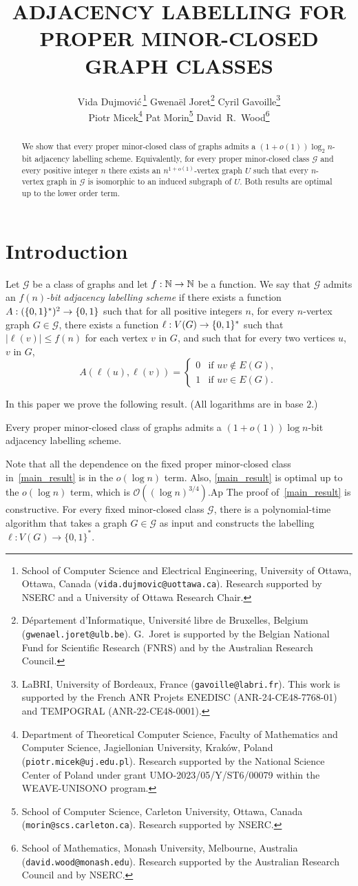 \documentclass{patmorin}
\title{\MakeUppercase{\boldmath  Adjacency labelling for proper minor-closed graph classes}}
\author{
 Vida Dujmovi{\'c}\,\footnote{School of Computer Science and Electrical Engineering, University of Ottawa, Ottawa, Canada (\texttt{vida.dujmovic@uottawa.ca}). Research supported by NSERC and a University of Ottawa Research Chair.}
 \qquad
 Gwena\"el Joret\footnote{D\'epartement d'Informatique, Universit\'e libre de Bruxelles, Belgium ({\tt gwenael.joret@ulb.be}). G.\ Joret is supported by the Belgian National Fund for Scientific Research (FNRS) and by the Australian Research Council.}
 \qquad
 Cyril Gavoille\footnote{LaBRI, University of Bordeaux, France (\texttt{gavoille@labri.fr}). This work is supported by the French ANR Projets ENEDISC (ANR-24-CE48-7768-01) and TEMPOGRAL (ANR-22-CE48-0001).}\\[1ex]
 Piotr Micek\footnote{Department of Theoretical Computer Science, Faculty of Mathematics and Computer Science, Jagiellonian University, Kraków, Poland (\texttt{piotr.micek@uj.edu.pl}). Research supported by the National Science Center of Poland under grant UMO-2023/05/Y/ST6/00079 within the WEAVE-UNISONO program.}
 \qquad
 Pat Morin\footnote{School of Computer Science, Carleton University, Ottawa, Canada (\texttt{morin@scs.carleton.ca}). Research supported by NSERC.}
 \qquad
 David~R.~Wood\footnote{School of Mathematics, Monash University, Melbourne, Australia (\texttt{david.wood@monash.edu}). Research supported by the Australian Research Council and by NSERC.}
 }
\date{}
\renewcommand{\leq}{\leqslant}
\newcommand{\defin}[1]{\emph{\textcolor{brightmaroon}{#1}}}
\newcommand{\calG}{\mathcal{G}}
\newcommand{\Oh}{\mathcal{O}}
\DeclarePairedDelimiter{\set}{\{}{\}}
\begin{document}
\maketitle


\begin{abstract}
  We show that every proper minor-closed class of graphs admits a $(1+o(1))\log_2 n$-bit adjacency labelling scheme. Equivalently, for every proper minor-closed class $\mathcal{G}$ and every positive integer $n$ there exists an $n^{1+o(1)}$-vertex graph $U$ such that every $n$-vertex graph in $\mathcal{G}$ is isomorphic to an induced subgraph of $U$.  Both results are optimal up to the lower order term.
\end{abstract}

 \newpage
 \tableofcontents

  \newpage
  \setcounter{page}{1}
  \section{Introduction}
Let $\calG$ be a class of graphs and let $f:\mathbb{N}\to\mathbb{N}$ be a function.
We say that $\calG$ admits an \defin{$f(n)$-bit adjacency labelling scheme} if there exists a function $A:(\set{0,1}^*)^2\to\set{0,1}$ such that for all positive integers $n$, for every $n$-vertex graph $G\in\calG$, there exists a function $\ell: V(G)\to\set{0,1}^*$ such that
$|\ell(v)|\leq f(n)$ for each vertex $v$ in $G$, and such that
for every two vertices $u$, $v$ in $G$,
\[
A(\ell(u),\ell(v))=\begin{cases}
0&\textrm{if $uv\notin E(G)$},\\
1&\textrm{if $uv\in E(G)$}.
\end{cases}
\]

In this paper we prove the following result. (All logarithms are in base $2$.)

\begin{thm}
\label{main_result}
Every proper minor-closed class of graphs admits
a $(1+o(1))\log n$-bit adjacency labelling scheme.
\end{thm}


Note that all the dependence on the fixed proper minor-closed class in~\cref{main_result} is in the $o(\log n)$ term. Also, \cref{main_result} is optimal up to the $o(\log n)$ term,
which is $\Oh\left((\log n)^{3/4}\right)$.Ap
The proof of~\cref{main_result} is constructive. For every fixed minor-closed class $\calG$, there is a polynomial-time algorithm that takes a graph $G\in\calG$ as input and constructs the labelling $\ell:V(G)\to\{0,1\}^*$.
\end{document}
